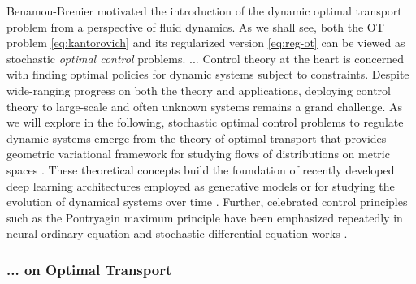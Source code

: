 Benamou-Brenier motivated the introduction of the dynamic optimal transport problem from a perspective of fluid dynamics.
As we shall see, both the OT problem \eqref{eq:kantorovich} and its regularized version \eqref{eq:reg-ot} can be viewed as stochastic \textit{optimal control} problems.
... %
Control theory at the heart is concerned with finding optimal policies for dynamic systems subject to constraints. Despite wide-ranging progress on both the theory and applications, deploying control theory to large-scale and often unknown systems remains a grand challenge.
As we will explore in the following, stochastic optimal control problems to regulate dynamic systems emerge from the theory of optimal transport \citep{santambrogio2015optimal} that provides geometric variational framework for studying flows of distributions on metric spaces \citep{chen2021optimal}.
These theoretical concepts build the foundation of recently developed deep learning architectures employed as generative models \citep{song2020score, de2021diffusion} or for studying the evolution of dynamical systems over time \citep{chen2021likelihood, bunne2022proximal, vargas2021solving}.
Further, celebrated control principles such as the Pontryagin maximum principle have been emphasized repeatedly in neural ordinary equation \citep{chen2018neural} and stochastic differential equation works \citep{jia2019neural}.

\subsubsection*{... on Optimal Transport} \label{sec:background_control_ot}

